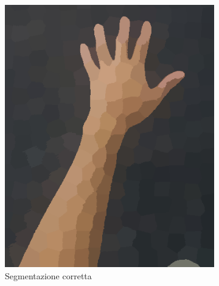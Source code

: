 \documentclass[12pt,a4paper,oneside]{article}
\begin{document}
\begin{figure}[!htb]
\begin{subfigure}[t]{.325\textwidth}
		\includegraphics[width=\textwidth]{resources/images/drifting300c.png}
		\captionsetup{justification=centering}
		\caption{Segmentazione corretta}
	\end{subfigure}%
	\vspace{.0033\textwidth}
	\begin{subfigure}[t]{.325\textwidth}

\end{subfigure}
\end{figure}
\end{document}
